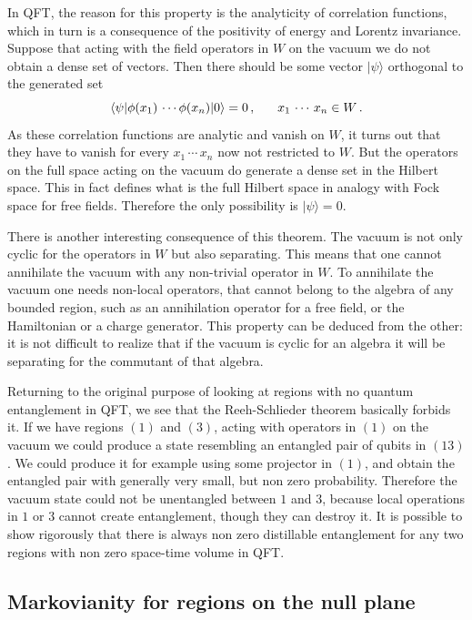 \documentclass[11pt]{article}
\numberwithin{equation}{section}
\newcommand{\be}{\begin{equation}}
\newcommand{\ee}{\end{equation}}
\begin{document}
In QFT, the reason for this property is the analyticity of correlation functions, which in turn is a consequence of the positivity of energy and Lorentz invariance. Suppose that acting with the field operators in $W$ on the vacuum we do not obtain a dense set of vectors. Then there should be some vector $|\psi\rangle$ orthogonal to the generated set
\be 
\langle \psi|\phi(x_1)\,\cdots \phi(x_n) |0\rangle=0\,,\hspace{.6cm} x_1\,\cdots\,x_n\in W\,. 
 \ee
As these correlation functions are analytic and vanish on $W$, it turns out that they have to vanish for every $x_1\,\cdots\,x_n$ now not restricted to $W$. But the operators on the full space acting on the vacuum do generate a dense set in the Hilbert space. This in fact defines what is the full Hilbert space in analogy with Fock space for free fields. Therefore the only possibility is $|\psi\rangle=0$.   


There is another interesting consequence of this theorem. The vacuum is not only cyclic for the operators in $W$ but also separating. This means that one cannot annihilate the vacuum with any non-trivial operator in $W$. To annihilate the vacuum one needs non-local operators, that cannot belong to the algebra of any bounded region, such as an annihilation operator for a free field, or the Hamiltonian or a charge generator. This property can be deduced from the other: it is not difficult to realize that if the vacuum is cyclic for an algebra it will be separating for the commutant of that algebra.  
 
Returning to the original purpose of looking at regions with no quantum entanglement in QFT, we see that the Reeh-Schlieder theorem basically forbids it. If we have regions $(1)$ and $(3)$, acting with operators in $(1)$ on the vacuum we could produce a state resembling an entangled pair of qubits in $(13)$. We could produce it for example using some projector in $(1)$, and obtain the entangled pair with generally very small, but non zero probability. Therefore the vacuum state could not be unentangled between $1$ and $3$, because local operations in $1$ or $3$ cannot create entanglement, though they can destroy it. It is possible to show rigorously that there is always non zero distillable entanglement for any two regions with non zero space-time volume in QFT.



\subsection{Markovianity for regions on the null plane}
\end{document}
